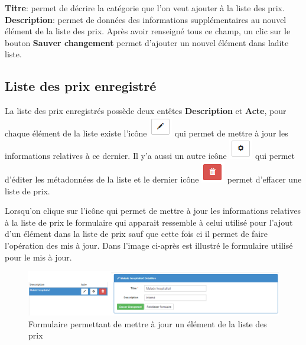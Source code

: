 \documentclass[12pt,a4paper]{report}
\begin{document}
\textbf{Titre}: permet de décrire la catégorie que l'on veut ajouter à la liste des prix.
\textbf{Description}: permet de données des informations supplémentaires au nouvel élément de la liste des prix. 
Après avoir renseigné tous ce champ, un clic sur le bouton \textbf{Sauver changement} permet d'ajouter un nouvel élément dans ladite liste.

\subsection{Liste des prix enregistré}

La liste des prix enregistrés possède deux entêtes \textbf{Description} et \textbf{Acte}, pour chaque élément de la liste existe l'icône \includegraphics[scale=0.7]{pic/EditBlack.png}  qui permet de mettre à jour les informations relatives à ce dernier. Il y'a aussi un autre icône  \includegraphics[scale=0.7]{pic/UpdateBlack.png} qui permet d'éditer les métadonnées de la liste et le dernier icône \includegraphics[scale=0.7]{pic/DeleteRed.png}  permet d'effacer une liste de prix.

Lorsqu'on clique sur l'icône qui permet de mettre à jour les informations relatives à la liste de prix le formulaire qui apparait ressemble à celui utilisé pour l'ajout d'un élément dans la liste de prix sauf que cette fois ci il permet de faire l'opération des mis à jour.
Dans l'image ci-après est illustré le formulaire utilisé pour le mis à jour.

\begin{figure}[h]
\begin{center}
\includegraphics[width=14cm]{pic/FormUpdateListePrice.png}
\end{center}
\caption{Formulaire permettant de mettre à jour un élément de la liste des prix}
\label{Formulaire permettant de mettre à jour un élément de la liste des prix}
\end{figure}
\end{document}
